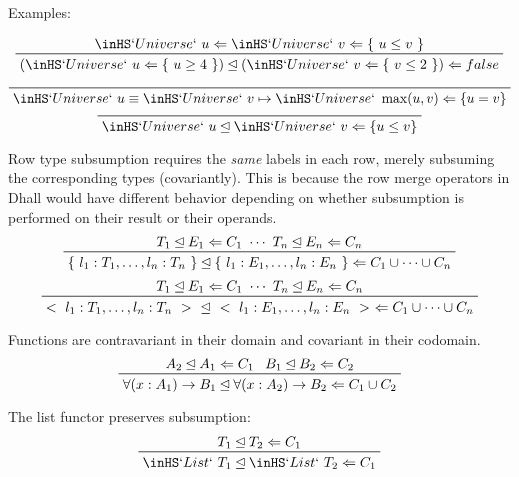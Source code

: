 \documentclass[11pt, twoside, reqno]{book}
\newcommand{\subsumedBy}{\unlhd}
\begin{document}
\begin{appdices}
Examples:

\begin{displaymath}
\prftree{\inHS`Universe`\ u \Leftarrow \inHS`Universe`\ v \Leftarrow \{\ u \le v\ \}}{(\inHS`Universe`\ u \Leftarrow \{\ u \ge 4\ \}) \subsumedBy (\inHS`Universe`\ v \Leftarrow \{\ v \le 2\ \}) \Leftarrow false}
\end{displaymath}

\begin{displaymath}
\prftree{\inHS`Universe`\ u \equiv \inHS`Universe`\ v \mapsto \inHS`Universe`\ \max(u,v) \Leftarrow \{u = v\}}
\end{displaymath}
\begin{displaymath}
\prftree{\inHS`Universe`\ u \subsumedBy \inHS`Universe`\ v \Leftarrow \{u \le v\}}
\end{displaymath}

Row type subsumption requires the \emph{same} labels in each row, merely subsuming the corresponding types (covariantly).
This is because the row merge operators in Dhall would have different behavior depending on whether subsumption is performed on their result or their operands.
\begin{displaymath}
\prftree
  {T_1 \subsumedBy E_1 \Leftarrow C_1\ \cdots\ T_n \subsumedBy E_n \Leftarrow C_n}
  {\{\ l_1 : T_1, \dots, l_n : T_n\ \} \subsumedBy \{\ l_1 : E_1, \dots, l_n : E_n\ \} \Leftarrow C_1 \cup \cdots \cup C_n}
\end{displaymath}
\begin{displaymath}
\prftree
  {T_1 \subsumedBy E_1 \Leftarrow C_1\ \cdots\ T_n \subsumedBy E_n \Leftarrow C_n}
  {<\ l_1 : T_1, \dots, l_n : T_n\ >\ \subsumedBy\ <\ l_1 : E_1, \dots, l_n : E_n\ >\ \Leftarrow C_1 \cup \cdots \cup C_n}
\end{displaymath}

Functions are contravariant in their domain and covariant in their codomain.
\begin{displaymath}
\prftree
  {A_2 \subsumedBy A_1 \Leftarrow C_1}
  {B_1 \subsumedBy B_2 \Leftarrow C_2}
  {\forall(x : A_1) \to B_1 \subsumedBy \forall(x : A_2) \to B_2 \Leftarrow C_1 \cup C_2}
\end{displaymath}

The list functor preserves subsumption:
\begin{displaymath}
\prftree
  {T_1 \subsumedBy T_2 \Leftarrow C_1}
  {\inHS`List`\ T_1 \subsumedBy \inHS`List`\ T_2 \Leftarrow C_1}
\end{displaymath}


\end{appdices}
\end{document}
